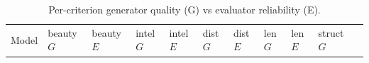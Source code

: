 \begin{longtable}[]{@{}
  >{\raggedright\arraybackslash}p{}
  >{\raggedleft\arraybackslash}p{}
  >{\raggedleft\arraybackslash}p{}
  >{\raggedleft\arraybackslash}p{}
  >{\raggedleft\arraybackslash}p{}
  >{\raggedleft\arraybackslash}p{}
  >{\raggedleft\arraybackslash}p{}
  >{\raggedleft\arraybackslash}p{}
  >{\raggedleft\arraybackslash}p{}
  >{\raggedleft\arraybackslash}p{}
  >{\raggedleft\arraybackslash}p{}@{}}
\caption{Per-criterion generator quality (G) vs evaluator reliability (E).}\tabularnewline
\toprule\noalign{}
\begin{minipage}[b]{\linewidth}\raggedright
Model
\end{minipage} & \begin{minipage}[b]{\linewidth}\raggedleft
beauty \(G\)
\end{minipage} & \begin{minipage}[b]{\linewidth}\raggedleft
beauty \(E\)
\end{minipage} & \begin{minipage}[b]{\linewidth}\raggedleft
intel \(G\)
\end{minipage} & \begin{minipage}[b]{\linewidth}\raggedleft
intel \(E\)
\end{minipage} & \begin{minipage}[b]{\linewidth}\raggedleft
dist \(G\)
\end{minipage} & \begin{minipage}[b]{\linewidth}\raggedleft
dist \(E\)
\end{minipage} & \begin{minipage}[b]{\linewidth}\raggedleft
len \(G\)
\end{minipage} & \begin{minipage}[b]{\linewidth}\raggedleft
len \(E\)
\end{minipage} & \begin{minipage}[b]{\linewidth}\raggedleft
struct \(G\)
\end{minipage} & \begin{minipage}[b]{\linewidth}\raggedleft

\end{minipage}
\end{longtable}
